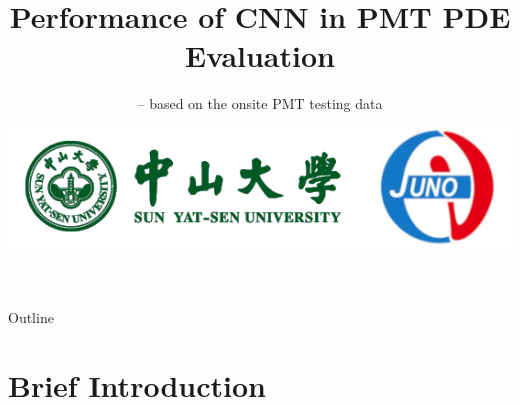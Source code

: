 \documentclass[11pt,compress,xcolor=x11names,UTF8]{beamer}
\title{Performance of CNN in PMT PDE Evaluation }
\subtitle{-- based on the onsite PMT testing data}
\author[Rong Zhao]{Email：zhaor25@mail2.sysu.edu.cn \and  } %
\institute[SYSU]{School of Physics\and } %
\date[\today]{\includegraphics[width=.5\textwidth]{logo}}
\begin{document}
\maketitle

\begin{frame}{Outline}
\tableofcontents
\end{frame}

\section{Brief Introduction}

\end{document}
